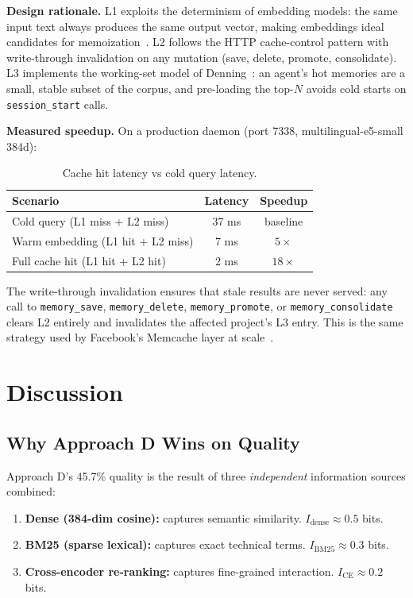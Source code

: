 \documentclass[12pt,a4paper]{article}
\theoremstyle{definition}
\theoremstyle{remark}
\begin{document}
\textbf{Design rationale.} L1 exploits the determinism of embedding models: the same input text always produces the same output vector, making embeddings ideal candidates for memoization~\cite{nishtala2013}. L2 follows the HTTP cache-control pattern with write-through invalidation on any mutation (save, delete, promote, consolidate). L3 implements the working-set model of Denning~\cite{denning1968}: an agent's hot memories are a small, stable subset of the corpus, and pre-loading the top-$N$ avoids cold starts on \texttt{session\_start} calls.

\textbf{Measured speedup.} On a production daemon (port 7338, multilingual-e5-small 384d):

\begin{table}[H]
\centering
\caption{Cache hit latency vs cold query latency.}
\label{tab:cache-latency}
\begin{tabular}{lcc}
\toprule
\textbf{Scenario} & \textbf{Latency} & \textbf{Speedup} \\
\midrule
Cold query (L1 miss + L2 miss) & 37 ms & baseline \\
Warm embedding (L1 hit + L2 miss) & 7 ms & $5\times$ \\
Full cache hit (L1 hit + L2 hit) & 2 ms & $18\times$ \\
\bottomrule
\end{tabular}
\end{table}

The write-through invalidation ensures that stale results are never served: any call to \texttt{memory\_save}, \texttt{memory\_delete}, \texttt{memory\_promote}, or \texttt{memory\_consolidate} clears L2 entirely and invalidates the affected project's L3 entry. This is the same strategy used by Facebook's Memcache layer at scale~\cite{nishtala2013}.

\section{Discussion}
\label{sec:discussion}

\subsection{Why Approach D Wins on Quality}

Approach D's 45.7\% quality is the result of three \textit{independent} information sources combined:
\begin{enumerate}
    \item \textbf{Dense (384-dim cosine):} captures semantic similarity. $I_{\mathrm{dense}} \approx 0.5$ bits.
    \item \textbf{BM25 (sparse lexical):} captures exact technical terms. $I_{\mathrm{BM25}} \approx 0.3$ bits.
    \item \textbf{Cross-encoder re-ranking:} captures fine-grained interaction. $I_{\mathrm{CE}} \approx 0.2$ bits.
\end{enumerate}
\end{document}
